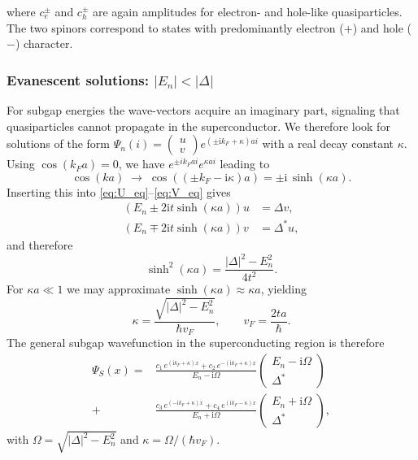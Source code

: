 \documentclass[11pt,a4paper,twoside,openany]{report}
\begin{document}
where $c_e^\pm$ and $c_h^\pm$ are again amplitudes for electron- and hole-like quasiparticles.  The two spinors correspond to states with predominantly electron ($+$) and hole ($-$) character.

\subsubsection{Evanescent solutions: $|E_n| < |\Delta|$}

For subgap energies the wave-vectors acquire an imaginary part, signaling that quasiparticles cannot propagate in the superconductor.  We therefore look for solutions of the form $\Psi_n(i) = \begin{pmatrix} u \\ v \end{pmatrix} e^{(\pm \mathrm{i} k_F + \kappa) a i}$ with a real decay constant $\kappa$.  Using $\cos(k_F a)=0$, we have $e^{\pm i k_F a i} e^{\kappa a i}$ leading to
\[
  \cos(k a) \;\to\; \cos((\pm k_F - \mathrm{i}\kappa)a) = \pm \mathrm{i}\,\sinh(\kappa a).
\]
Inserting this into \eqref{eq:U_eq}--\eqref{eq:V_eq} gives
\begin{align}
  (E_n \pm 2 \mathrm{i} t \sinh(\kappa a)) u &= \Delta v, \\
  (E_n \mp 2 \mathrm{i} t \sinh(\kappa a)) v &= \Delta^* u,
\end{align}
and therefore
\begin{equation}
  \sinh^2(\kappa a) = \frac{|\Delta|^2 - E_n^2}{4 t^2}.
  \label{eq:sinh2}
\end{equation}
For $\kappa a \ll 1$ we may approximate $\sinh(\kappa a) \approx \kappa a$, yielding
\begin{equation}
  \kappa = \frac{\sqrt{|\Delta|^2 - E_n^2}}{\hbar v_F}, \qquad v_F = \frac{2ta}{\hbar}.
  \label{eq:kappa}
\end{equation}
The general subgap wavefunction in the superconducting region is therefore
\begin{equation}
  \boxed{
  \begin{aligned}
  \Psi_S(x) = &
    \frac{c_1\, e^{(\mathrm{i} k_F + \kappa)x} + c_2\, e^{-(\mathrm{i} k_F + \kappa)x}}
         {E_n - \mathrm{i}\Omega}
    \begin{pmatrix} E_n - \mathrm{i}\Omega \\ \Delta^* \end{pmatrix} \\[4pt]
  + & \frac{c_3\, e^{(-\mathrm{i} k_F + \kappa)x} + c_4\, e^{(\mathrm{i} k_F - \kappa)x}}
         {E_n + \mathrm{i}\Omega}
    \begin{pmatrix} E_n + \mathrm{i}\Omega \\ \Delta^* \end{pmatrix},
  \end{aligned}}
  \label{eq:Psi_S_below}
\end{equation}
with $\Omega = \sqrt{|\Delta|^2 - E_n^2}$ and $\kappa = \Omega/(\hbar v_F)$.
\end{document}
